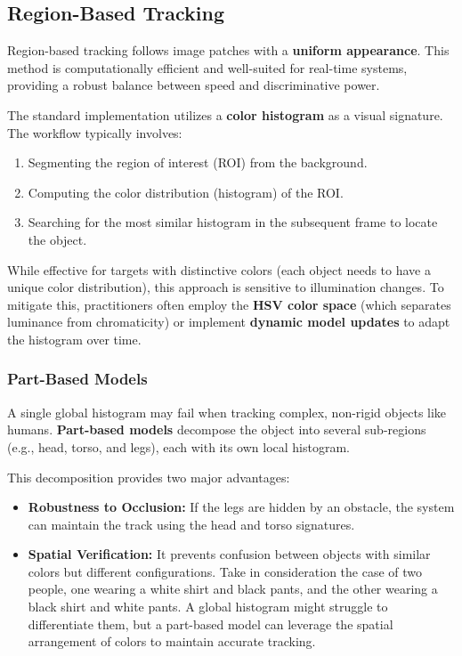 \subsection{Region-Based Tracking}
Region-based tracking follows image patches with a \textbf{uniform appearance}. 
This method is computationally efficient and well-suited for real-time systems, providing a robust balance
between speed and discriminative power.

The standard implementation utilizes a \textbf{color histogram} as a visual signature. 
The workflow typically involves:
\begin{enumerate}
    \item Segmenting the region of interest (ROI) from the background.
    \item Computing the color distribution (histogram) of the ROI.
    \item Searching for the most similar histogram in the subsequent frame to locate the object.
\end{enumerate}

While effective for targets with distinctive colors (each object needs to have a unique color distribution), this approach is sensitive to illumination changes. 
To mitigate this, practitioners often employ the \textbf{HSV color space} (which separates luminance from chromaticity) 
or implement \textbf{dynamic model updates} to adapt the histogram over time.

\subsubsection{Part-Based Models}
A single global histogram may fail when tracking complex, non-rigid objects like humans. 
\textbf{Part-based models} decompose the object into several sub-regions (e.g., head, torso, and legs), 
each with its own local histogram.

This decomposition provides two major advantages:
\begin{itemize}
    \item \textbf{Robustness to Occlusion:} If the legs are hidden by an obstacle, 
    the system can maintain the track using the head and torso signatures.
    \item \textbf{Spatial Verification:} It prevents confusion between objects with similar colors but different 
    configurations. Take in consideration the case of two people, one wearing a white shirt and black pants, 
    and the other wearing a black shirt and white pants. A global histogram might struggle to differentiate them, 
    but a part-based model can leverage the spatial arrangement of colors to maintain accurate tracking.
\end{itemize}

